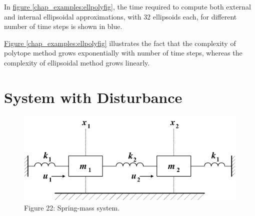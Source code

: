 \documentclass[letterpaper,10pt,english]{sphinxmanual}
\begin{document}
In \hyperref[chap_examples:ellpolyfig]{figure  \ref*{chap_examples:ellpolyfig}}, the time required to compute both external and
internal ellipsoidal approximations, with \(32\) ellipsoids each,
for different number of time steps is shown in blue.

\hyperref[chap_examples:ellpolyfig]{Figure  \ref*{chap_examples:ellpolyfig}} illustrates the fact that the complexity of polytope
method grows exponentially with number of time steps, whereas the
complexity of ellipsoidal method grows linearly.


\section{System with Disturbance}
\label{chap_examples:system-with-disturbance}\begin{figure}[htbp]
\centering
\capstart

\includegraphics[width=0.300\linewidth]{chapter06_section02_springmass.png}
\caption{Figure 22: Spring-mass system.}\label{chap_examples:springmassfig}\end{figure}
\end{document}
